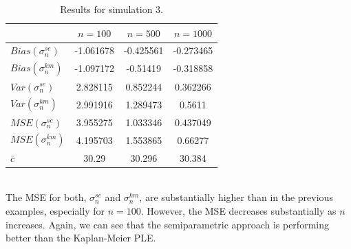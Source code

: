 \begin{table}[h!]
	\begin{center}

	\begin{tabular}{| l || c | c | c |}	
		\hline
		& $ n = 100 $ & $ n = 500 $ & $ n = 1000 $\\
		\hline
		\hline
		$Bias(\sigma_n^{se})$ & -1.061678 & -0.425561 & -0.273465\\
		$Bias(\sigma_n^{km})$ & -1.097172 & -0.51419 & -0.318858\\
		\hline
		$Var(\sigma_n^{se})$ & 2.828115 & 0.852244 & 0.362266\\
		$Var(\sigma_n^{km})$ & 2.991916 & 1.289473 & 0.5611\\
		\hline
		$MSE(\sigma_n^{se})$ & 3.955275 & 1.033346 & 0.437049\\
		$MSE(\sigma_n^{km})$ & 4.195703 & 1.553865 & 0.66277\\
		\hline
		\hline
		$\bar c$ & 30.29 & 30.296 & 30.384\\
		\hline
	\end{tabular}
	\end{center}
	\caption{Results for simulation 3.}
	\label{tab:res_exppar1}
\end{table}\\
The MSE for both, $\sigma_n^{se}$ and $\sigma_n^{km}$, are substantially higher than in the previous examples, especially for $n=100$. However, the MSE decreases substantially as $n$ increases. Again, we can see that the semiparametric approach is performing better than the Kaplan-Meier PLE.

